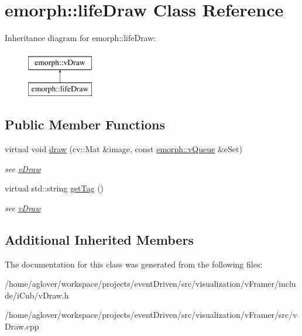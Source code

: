 \hypertarget{classemorph_1_1lifeDraw}{\section{emorph\-:\-:life\-Draw Class Reference}
\label{classemorph_1_1lifeDraw}
}
Inheritance diagram for emorph\-:\-:life\-Draw\-:\begin{figure}[H]
\begin{center}
\leavevmode
\includegraphics[height=2.000000cm]{classemorph_1_1lifeDraw}
\end{center}
\end{figure}
\subsection*{Public Member Functions}
\begin{DoxyCompactItemize}
\item 
\hypertarget{classemorph_1_1lifeDraw_a2323f8371720151079ab6304d1672853}{virtual void \hyperlink{classemorph_1_1lifeDraw_a2323f8371720151079ab6304d1672853}{draw} (cv\-::\-Mat \&image, const \hyperlink{classemorph_1_1vQueue}{emorph\-::v\-Queue} \&e\-Set)}\label{classemorph_1_1lifeDraw_a2323f8371720151079ab6304d1672853}

\begin{DoxyCompactList}\small\item\em see \hyperlink{classemorph_1_1vDraw}{v\-Draw} \end{DoxyCompactList}\item 
\hypertarget{classemorph_1_1lifeDraw_a11b718fa894541473ea67e0d98331d7a}{virtual std\-::string \hyperlink{classemorph_1_1lifeDraw_a11b718fa894541473ea67e0d98331d7a}{get\-Tag} ()}\label{classemorph_1_1lifeDraw_a11b718fa894541473ea67e0d98331d7a}

\begin{DoxyCompactList}\small\item\em see \hyperlink{classemorph_1_1vDraw}{v\-Draw} \end{DoxyCompactList}\end{DoxyCompactItemize}
\subsection*{Additional Inherited Members}


The documentation for this class was generated from the following files\-:\begin{DoxyCompactItemize}
\item 
/home/aglover/workspace/projects/event\-Driven/src/visualization/v\-Framer/include/i\-Cub/v\-Draw.\-h\item 
/home/aglover/workspace/projects/event\-Driven/src/visualization/v\-Framer/src/v\-Draw.\-cpp\end{DoxyCompactItemize}
